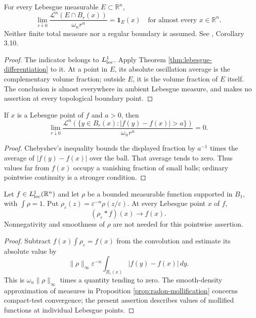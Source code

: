 \begin{corollary}\label{cor:lebesgue-density-theorem}
For every Lebesgue measurable $E\subset\mathbb R^n$,
\[
 \lim_{r\downarrow0}\frac{\mathcal L^n(E\cap B_r(x))}{\omega_n r^n}
 =\mathbf1_E(x)\quad\text{for almost every }x\in\mathbb R^n.
\]
Neither finite total measure nor a regular boundary is assumed. See \cite{Sim18}, Corollary 3.10.
\end{corollary}
\begin{proof}
The indicator belongs to $L^1_{\rm loc}$. Apply Theorem \ref{thm:lebesgue-differentiation} to it. At a point in $E$, its absolute oscillation average is the complementary volume fraction; outside $E$, it is the volume fraction of $E$ itself. The conclusion is almost everywhere in ambient Lebesgue measure, and makes no assertion at every topological boundary point.
\end{proof}

\begin{proposition}\label{prop:lebesgue-approximate-continuity}
If $x$ is a Lebesgue point of $f$ and $a>0$, then
\[
 \lim_{r\downarrow0}
 \frac{\mathcal L^n(\{y\in B_r(x):|f(y)-f(x)|>a\})}{\omega_n r^n}=0.
\]
\end{proposition}
\begin{proof}
Chebyshev's inequality bounds the displayed fraction by $a^{-1}$ times the average of $|f(y)-f(x)|$ over the ball. That average tends to zero. Thus values far from $f(x)$ occupy a vanishing fraction of small balls; ordinary pointwise continuity is a stronger condition.
\end{proof}

\begin{proposition}\label{prop:mollifiers-at-lebesgue-points}
Let $f\in L^1_{\rm loc}(\mathbb R^n)$ and let $\rho$ be a bounded measurable function supported in $B_1$, with $\int\rho=1$. Put $\rho_\varepsilon(z)=\varepsilon^{-n}\rho(z/\varepsilon)$. At every Lebesgue point $x$ of $f$,
\[
 (\rho_\varepsilon*f)(x)\longrightarrow f(x).
\]
Nonnegativity and smoothness of $\rho$ are not needed for this pointwise assertion.
\end{proposition}
\begin{proof}
Subtract $f(x)\int\rho_\varepsilon=f(x)$ from the convolution and estimate its absolute value by
\[
 \|\rho\|_\infty\varepsilon^{-n}
       \int_{B_\varepsilon(x)}|f(y)-f(x)|\,dy.
\]
This is $\omega_n\|\rho\|_\infty$ times a quantity tending to zero. The smooth-density approximation of measures in Proposition \ref{prop:radon-mollification} concerns compact-test convergence; the present assertion describes values of mollified functions at individual Lebesgue points.
\end{proof}

